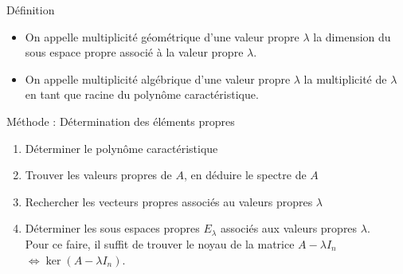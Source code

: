 \begin{bclogo}[couleur=blue!30,couleurBord=blue,arrondi=0.1,logo=\bcbook,ombre=true]{Définition}
\begin{itemize}
    \item On appelle multiplicité géométrique d'une valeur propre $\lambda$ la dimension du sous espace propre associé à la valeur propre $\lambda$.
    \item On appelle multiplicité algébrique d'une valeur propre $\lambda$ la multiplicité de $\lambda$ en tant que racine du polynôme caractéristique.
\end{itemize}
\end{bclogo}

\begin{bclogo}[logo=\bclampe,arrondi=0.1,ombre=true, couleur=yellow!60,couleurBord=yellow]{Méthode : Détermination des éléments propres}
\begin{enumerate}
    \item Déterminer le polynôme caractéristique
    \item Trouver les valeurs propres de $A$, en déduire le spectre de $A$
    \item Rechercher les vecteurs propres associés au valeurs propres $\lambda$
    \item Déterminer les sous espaces propres $E_{\lambda}$ associés aux valeurs propres $\lambda$.\\
    Pour ce faire, il suffit de trouver le noyau de la matrice $A-\lambda I_n$ $\Leftrightarrow \ker(A-\lambda I_n)$.\\
\end{enumerate}
\end{bclogo}
